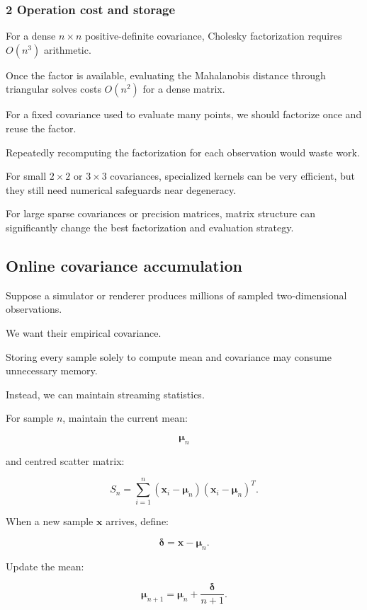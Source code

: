 \subsubsection{2 Operation cost and storage}\label{02-foundations-ii-ch031-operation-cost-and-storage}

For a dense \(n\times n\) positive-definite covariance, Cholesky factorization requires \(O(n^3)\) arithmetic.

Once the factor is available, evaluating the Mahalanobis distance through triangular solves costs \(O(n^2)\) for a dense matrix.

For a fixed covariance used to evaluate many points, we should factorize once and reuse the factor.

Repeatedly recomputing the factorization for each observation would waste work.

For small \(2\times2\) or \(3\times3\) covariances, specialized kernels can be very efficient, but they still need numerical safeguards near degeneracy.

For large sparse covariances or precision matrices, matrix structure can significantly change the best factorization and evaluation strategy.

\subsection{Online covariance accumulation}\label{02-foundations-ii-ch031-online-covariance-accumulation}

Suppose a simulator or renderer produces millions of sampled two-dimensional observations.

We want their empirical covariance.

Storing every sample solely to compute mean and covariance may consume unnecessary memory.

Instead, we can maintain streaming statistics.

For sample \(n\), maintain the current mean:

\[
 \boldsymbol\mu_n
\]

and centred scatter matrix:

\[
 S_n= \sum_{i=1}^{n} (\mathbf x_i-\boldsymbol\mu_n) (\mathbf x_i-\boldsymbol\mu_n)^T.
\]

When a new sample \(\mathbf x\) arrives, define:

\[
 \boldsymbol\delta=\mathbf x-\boldsymbol\mu_n.
\]

Update the mean:

\[
 \boxed{ \boldsymbol\mu_{n+1} = \boldsymbol\mu_n+ \frac{\boldsymbol\delta}{n+1} }.
\]

